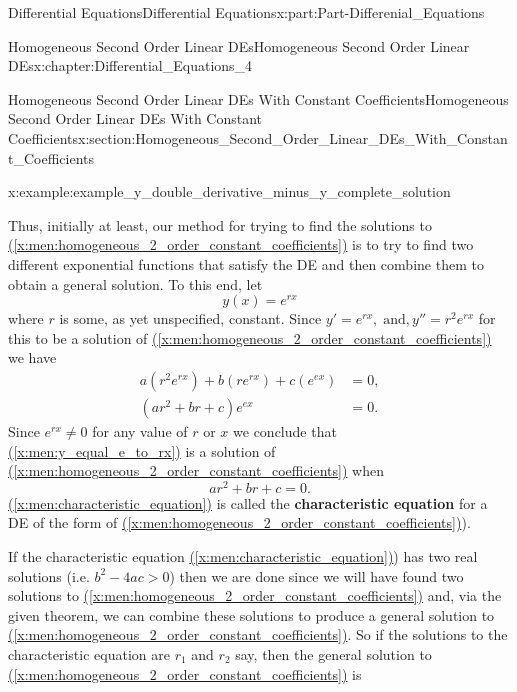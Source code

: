 \documentclass[oneside,10pt,]{book}
\newcommand{\xreffont}{\relax}
\newcommand{\terminology}[1]{\textbf{#1}}
\numberwithin{equation}{section}
\newcommand{\amp}{&}
\begin{document}
\begin{partptx}{Differential Equations}{}{Differential Equations}{}{}{x:part:Part-Differenial_Equations}
\begin{chapterptx}{Homogeneous Second Order Linear DEs}{}{Homogeneous Second Order Linear DEs}{}{}{x:chapter:Differential_Equations_4}
\begin{sectionptx}{Homogeneous Second Order Linear DEs With Constant Coefficients}{}{Homogeneous Second Order Linear DEs With Constant Coefficients}{}{}{x:section:Homogeneous_Second_Order_Linear_DEs_With_Constant_Coefficients}
\begin{example}{}{x:example:example_y_double_derivative_minus_y_complete_solution}
\end{example}
Thus, initially at least, our method for trying to find the solutions to \hyperref[x:men:homogeneous_2_order_constant_coefficients]{({\xreffont\ref{x:men:homogeneous_2_order_constant_coefficients}})} is to try to find two different exponential functions that satisfy the DE and then combine them to obtain a general solution. To this end, let%
\begin{equation}
y(x)=e^{rx}\label{x:men:y_equal_e_to_rx}
\end{equation}
where \(r \) is some, as yet unspecified, constant. Since \(y'=e^{rx}, \; \text{and}, y''=r^{2}e^{rx} \)  for this to be a solution of \hyperref[x:men:homogeneous_2_order_constant_coefficients]{({\xreffont\ref{x:men:homogeneous_2_order_constant_coefficients}})} we have%
\begin{align*}
a (r^{2} e^{rx}) + b(r e^{rx}) + c(e^{ex}) \amp =0,  \\
(ar^{2} + br + c) e^{ex} \amp =0.  
\end{align*}
Since \(e^{rx}\neq 0 \)  for any value of \(r \) or \(x \) we conclude that \hyperref[x:men:y_equal_e_to_rx]{({\xreffont\ref{x:men:y_equal_e_to_rx}})} is a solution of \hyperref[x:men:homogeneous_2_order_constant_coefficients]{({\xreffont\ref{x:men:homogeneous_2_order_constant_coefficients}})} when%
\begin{equation}
ar^{2}+br+c=0.\label{x:men:characteristic_equation}
\end{equation}
\hyperref[x:men:characteristic_equation]{({\xreffont\ref{x:men:characteristic_equation}})} is called the \terminology{characteristic equation} for a DE of the form of \hyperref[x:men:homogeneous_2_order_constant_coefficients]{({\xreffont\ref{x:men:homogeneous_2_order_constant_coefficients}})}).%
\par
If the characteristic equation \hyperref[x:men:characteristic_equation]{({\xreffont\ref{x:men:characteristic_equation}})}) has two real solutions (i.e. \(b^{2}-4ac>0 \)) then we are done since we will have found two solutions to \hyperref[x:men:homogeneous_2_order_constant_coefficients]{({\xreffont\ref{x:men:homogeneous_2_order_constant_coefficients}})} and, via the given theorem, we can combine these solutions to produce a general solution to \hyperref[x:men:homogeneous_2_order_constant_coefficients]{({\xreffont\ref{x:men:homogeneous_2_order_constant_coefficients}})}. So if the solutions to the characteristic equation are  \(r_{1} \) and \(r_{2} \)    say, then the general solution to \hyperref[x:men:homogeneous_2_order_constant_coefficients]{({\xreffont\ref{x:men:homogeneous_2_order_constant_coefficients}})} is%

\end{sectionptx}
\end{chapterptx}
\end{partptx}
\end{document}
